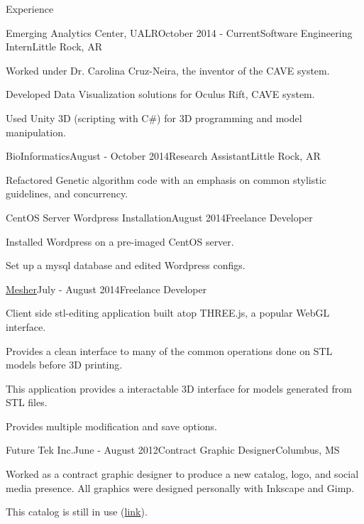 \documentclass{resume} %
\begin{document}
\begin{rSection}{Experience}

\begin{rSubsection}{Emerging Analytics Center, UALR}{October 2014 - Current}{Software Engineering Intern}{Little Rock, AR}

	\item Worked under Dr. Carolina Cruz-Neira, the inventor of the CAVE system.
	\item Developed Data Visualization solutions for Oculus Rift, CAVE system.
	\item Used Unity 3D (scripting with C\#) for 3D programming and model manipulation.
\end{rSubsection}

\begin{rSubsection}{BioInformatics}{August - October 2014}{Research Assistant}{Little Rock, AR}

	\item Refactored Genetic algorithm code with an emphasis on common stylistic guidelines, and concurrency.
\end{rSubsection}

\begin{rSubsection}{CentOS Server Wordpress Installation}{August 2014}{Freelance Developer}{}

	\item Installed Wordpress on a pre-imaged CentOS server.
	\item Set up a mysql database and edited Wordpress configs.
\end{rSubsection}

\begin{rSubsection}{\href{http://github.com/cptaffe/Mesher}{Mesher}}{July - August 2014}{Freelance Developer}{}

	\item Client side stl-editing application built atop THREE.js, a popular WebGL interface.
	\item Provides a clean interface to many of the common operations done on STL models before 3D printing.
	\item This application provides a interactable 3D interface for models generated from STL files.
	\item Provides multiple modification and save options.
\end{rSubsection}

\begin{rSubsection}{Future Tek Inc.}{June - August 2012}{Contract Graphic Designer}{Columbus, MS}

	\item Worked as a contract graphic designer to produce a new catalog, logo, and social media presence. All graphics were designed personally with Inkscape and Gimp.
	\item This catalog is still in use (\href{http://www.futuretekinc.com/wp-content/uploads/2014/08/Future-Tek-Catalog.pdf}{link}).
\end{rSubsection}

\end{rSection}
\end{document}
